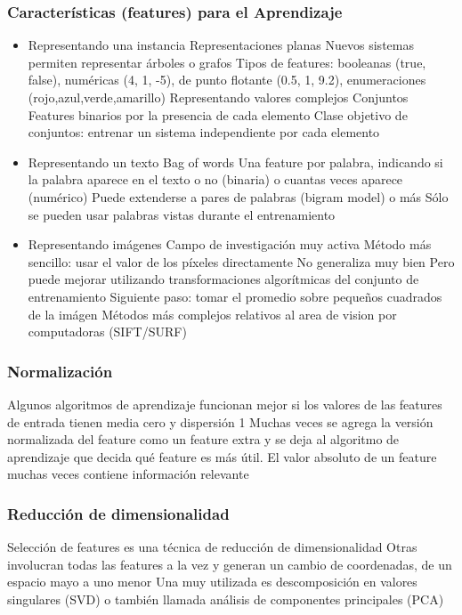\documentclass[a4paper,10pt]{article}
\begin{document}
    \subsubsection{Características (features) para el Aprendizaje}
      \begin{itemize}
	\item Representando una instancia
	  Representaciones planas
	  Nuevos sistemas permiten representar árboles o grafos
	  Tipos de features: booleanas (true, false), numéricas (4, 1, -5), de punto flotante (0.5, 1, 9.2), enumeraciones (rojo,azul,verde,amarillo)
	  Representando valores complejos
	  Conjuntos
	  Features binarios por la presencia de cada elemento
	Clase objetivo de conjuntos: entrenar un sistema independiente por cada elemento
	\item Representando un texto
	  \subitem Bag of words
	  \subitem Una feature por palabra, indicando si la palabra aparece en el texto o no (binaria) o cuantas veces aparece (numérico)
	  \subitem Puede extenderse a pares de palabras (bigram model) o más
	  \subitem Sólo se pueden usar palabras vistas durante el entrenamiento
	\item Representando imágenes
	  \subitem Campo de investigación muy activa
	  \subitem Método más sencillo: usar el valor de los píxeles directamente
	  \subitem No generaliza muy bien
	  \subitem Pero puede mejorar utilizando transformaciones algorítmicas del conjunto de entrenamiento
	  \subitem Siguiente paso: tomar el promedio sobre pequeños cuadrados de la imágen
	  \subitem Métodos más complejos relativos al area de vision por computadoras (SIFT/SURF)
      \end{itemize}


      \subsubsection{Normalización}
	Algunos algoritmos de aprendizaje funcionan mejor si los valores de las features de entrada tienen media cero y dispersión 1
	Muchas veces se agrega la versión normalizada del feature como un feature extra y se deja al algoritmo de aprendizaje que decida qué feature es más útil.
	El valor absoluto de un feature muchas veces contiene información relevante

      \subsubsection{Reducción de dimensionalidad}
	Selección de features es una técnica de reducción de dimensionalidad
	Otras involucran todas las features a la vez y generan un cambio de coordenadas, de un espacio mayo a uno menor
	Una muy utilizada es descomposición en valores singulares (SVD) o también llamada análisis de componentes principales (PCA)
\end{document}
